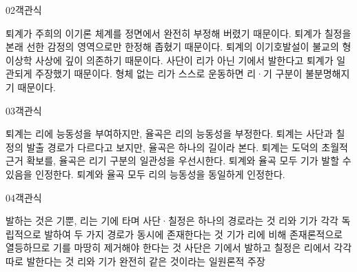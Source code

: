 \documentclass[fs85,seriesWit]{korfarm-base}
\begin{document}
\begin{kfQBlock}{02}{객관식}
\begin{kfChoices}
\kfChoice 퇴계가 주희의 이기론 체계를 정면에서 완전히 부정해 버렸기 때문이다.
\kfChoice 퇴계가 칠정을 본래 선한 감정의 영역으로만 한정해 좁혔기 때문이다.
\kfChoice 퇴계의 이기호발설이 불교의 형이상학 사상에 깊이 의존하기 때문이다.
\kfChoice 사단이 리가 아닌 기에서 발한다고 퇴계가 일관되게 주장했기 때문이다.
\kfChoice 형체 없는 리가 스스로 운동하면 리·기 구분이 불분명해지기 때문이다.
\end{kfChoices}
\end{kfQBlock}

\begin{kfQBlock}{03}{객관식}
\begin{kfChoices}
\kfChoice 퇴계는 리에 능동성을 부여하지만, 율곡은 리의 능동성을 부정한다.
\kfChoice 퇴계는 사단과 칠정의 발출 경로가 다르다고 보지만, 율곡은 하나의 길이라 본다.
\kfChoice 퇴계는 도덕의 초월적 근거 확보를, 율곡은 리기 구분의 일관성을 우선시한다.
\kfChoice 퇴계와 율곡 모두 기가 발할 수 있음을 인정한다.
\kfChoice 퇴계와 율곡 모두 리의 능동성을 동일하게 인정한다.
\end{kfChoices}
\end{kfQBlock}

\begin{kfQBlock}{04}{객관식}
\begin{kfChoices}
\kfChoice 발하는 것은 기뿐, 리는 기에 타며 사단·칠정은 하나의 경로라는 것
\kfChoice 리와 기가 각각 독립적으로 발하여 두 가지 경로가 동시에 존재한다는 것
\kfChoice 기가 리에 비해 존재론적으로 열등하므로 기를 마땅히 제거해야 한다는 것
\kfChoice 사단은 기에서 발하고 칠정은 리에서 각각 따로 발한다는 것
\kfChoice 리와 기가 완전히 같은 것이라는 일원론적 주장
\end{kfChoices}
\end{kfQBlock}

\kfEndMC
\end{document}
